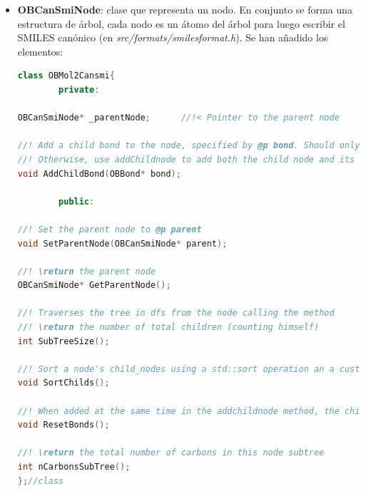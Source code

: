 \begin{itemize}
\begin{lstlisting}[language=C++]
//Adds information to the molecule of the blocks that form it. Being a block, each set of atoms that, due to their bonds, are within the same parenthesis in the original input Smiles. Or, according to the OBMol2Cansmi::BuildCanonTree method, the parent-child relationship between atoms.
void IdentifyBranches(OBMol& mol,OBCanSmiNode* node, BranchBlock* branch = nullptr);

//Modifies the tree built by BuildCanonTree based on the length of the branches identified in IdentifyBranches. This is a canonical rule designed for a little more consistency in the output canon smiles.
void RearrangeTree(OBCanSmiNode* node);

//Builds the SMILES tree, in canonical order, for the specified molecular fragment. Based on the BuildCanonTree method. Shares much of the code, with some changes in the neighbour selection algorithm.
bool BuildCanonTreeOgm(OBMol& mol, OBBitVec& frag_atoms, vector<unsigned int>& canonical_order, OBCanSmiNode* node);
};//class
    \end{lstlisting}


    \item \textbf{OBCanSmiNode}: clase que representa un nodo. En conjunto se forma una estructura de árbol, cada nodo es un átomo del árbol para luego escribir el SMILES canónico (en \textit{src/formats/smilesformat.h}). Se han añadido los elementos:
    \begin{lstlisting}[language=C++]
class OBMol2Cansmi{
        private: 
    
OBCanSmiNode* _parentNode;      //!< Pointer to the parent node

//! Add a child bond to the node, specified by @p bond. Should only be used in the ResetBonds method as a part of the OBMol2Cansmi::RearrangeTree algorithm.
//! Otherwise, use addChildnode to add both the child node and its respective bonds
void AddChildBond(OBBond* bond);

        public: 

//! Set the parent node to @p parent
void SetParentNode(OBCanSmiNode* parent);

//! \return the parent node
OBCanSmiNode* GetParentNode();

//! Traverses the tree in dfs from the node calling the method
//! \return the number of total children (counting himself) 
int SubTreeSize();

//! Sort a node's child_nodes using a std::sort operation an a custom comparator 'mycomp'
void SortChilds();

//! When added at the same time in the addchildnode method, the child with its bond have a 1 to 1 index correspondence. When reordering the children, in OBMol2Cansmi::RearrangeTree, the indices of the bonds are lost. This method clears and adds the bonds back in order.
void ResetBonds();

//! \return the total number of carbons in this node subtree
int nCarbonsSubTree();
};//class
    \end{lstlisting}

\end{itemize}
